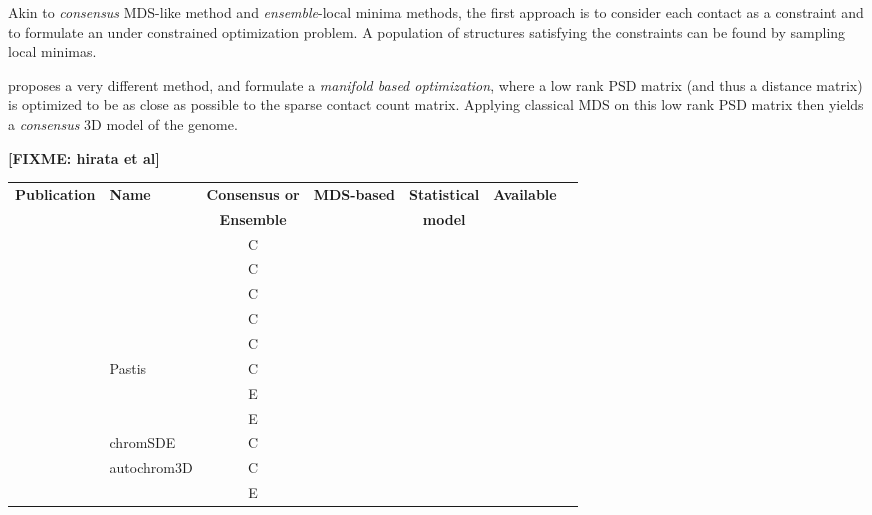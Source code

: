 \documentclass[2columns]{article}
\newcommand*\CHECK{\ding{51}}
\newcommand{\fixme}[1]{\textbf{[FIXME: #1]}}
\begin{document}
Akin to {\em consensus} MDS-like method and {\em ensemble}-local minima
methods,  the first approach is to consider each contact as a constraint and
to formulate an under constrained optimization problem. A population of
structures satisfying the constraints can be found by sampling local
minimas.

\citet{paulsen:manifold} proposes a very different method, and formulate a
\textit{manifold based optimization}, where a low rank PSD matrix (and thus a
distance matrix) is optimized to be as close as possible to the sparse contact
count matrix. Applying classical MDS on this low rank PSD matrix then yields a
\textit{consensus} 3D model of the genome.

\fixme{hirata et al}

\begin{table}[ht!]
\begin{center}
\scriptsize
\begin{tabular}{rlccccc}
\hline
\multirow{2}{*}{\textbf{\footnotesize Publication}} & \multirow{2}{*}{\textbf{\footnotesize Name}} &
\textbf{\footnotesize Consensus or} 
&\multirow{2}{*}{\textbf{\footnotesize MDS-based}} & \textbf{\footnotesize Statistical} &
\multirow{2}{*}{\textbf{\footnotesize Available}} \\
& & \textbf{\footnotesize Ensemble}
 & & \textbf{\footnotesize model} & \\
\hline
\hline
\scriptsize{\cite{dekker:capturing}} & & C & \CHECK & & \\
\scriptsize{\cite{duan:three-dimensional}} &  & C & \CHECK & & \CHECK \\
\scriptsize{\cite{tanizawa:mapping}} & & C & \CHECK & & \\
\scriptsize{\cite{ay:three-dimensional}} & & C & \CHECK & & \\
\scriptsize{\cite{ben-elazar:spatial}} & & C & \CHECK & & \CHECK \\
\scriptsize{\cite{varoquaux:statistical}} & Pastis & C & & \CHECK & \CHECK\\
\scriptsize{\cite{bau:three-dimensional}} & & E & & &  \\
\scriptsize{\cite{umbarger:three-dimensional}} & & E  & & &\\
\scriptsize{\cite{zhang:inference}} & chromSDE & C &  \CHECK & & \CHECK\\
\scriptsize{\cite{peng:sequencing}} & autochrom3D & C &  \CHECK & & \CHECK\\
\scriptsize{\cite{rousseau:three}} & & E & & \CHECK & \CHECK\\

\end{tabular}
\end{center}
\end{table}
\end{document}
